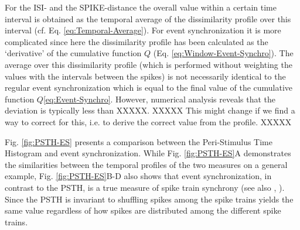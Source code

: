 \documentclass[10pt,twocolumn]{elsart5p}
\begin{document}
For the ISI- and the SPIKE-distance the overall value within a certain time interval is obtained as the temporal average of the dissimilarity profile over this interval (cf. Eq. \ref{eq:Temporal-Average}). For event synchronization it is more complicated since here the dissimilarity profile has been calculated as the `derivative' of the cumulative function $Q$ (Eq. \ref{eq:Window-Event-Synchro}). The average over this dissimilarity profile (which is performed without weighting the values with 	the intervals between the spikes) is not necessarily identical to the regular event synchronization which is equal to the final value of the cumulative function $Q$\ref{eq:Event-Synchro}. However, numerical analysis reveals that the deviation is typically less than XXXXX.
XXXXX This might change if we find a way to correct for this, i.e. to derive the correct value from the profile. XXXXX

Fig. \ref{fig:PSTH-ES} presents a comparison between the Peri-Stimulus Time Histogram and event synchronization. While Fig. \ref{fig:PSTH-ES}A demonstrates the similarities between the temporal profiles of the two measures on a general example, Fig. \ref{fig:PSTH-ES}B-D also shows that event synchronization, in contrast to  the PSTH, is a true measure of spike train synchrony (see also \citeauthor{Kreuz11}, \citeyear{Kreuz11}). Since the PSTH is invariant to shuffling spikes among the spike trains yields the same value regardless of how spikes are distributed among the different spike trains.
\end{document}

